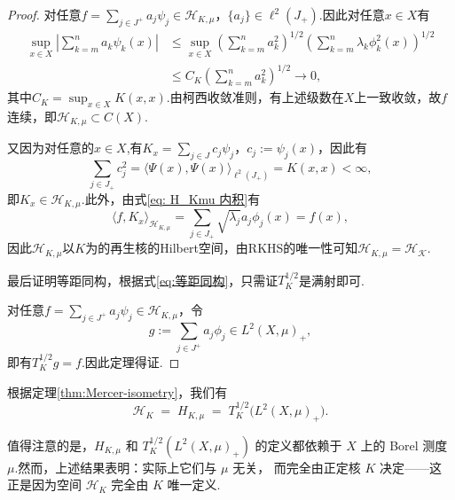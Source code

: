 \documentclass[../master.tex]{subfiles}
\begin{document}
\begin{proof}
    对任意$f = \sum_{j\in J^+}a_j\psi_j\in \mathcal{H}_{K,\mu}$，$\{a_j\}\in \ell^2(J_+)$.因此对任意$x\in X$有
    \begin{align*}
        \sup_{x\in X} \left|\sum_{k=m}^n a_k\psi_k(x)\right|&\leq \sup_{x\in X}\left(\sum_{k=m}^na_k^2\right)^{1/2}\left(\sum_{k=m}^n\lambda_k\phi^2_k(x)\right)^{1/2}\\
        &\leq C_K\left(\sum_{k=m}^na_k^2\right)^{1/2}\to 0,
    \end{align*}
其中$C_K = \sup_{x\in X}K(x,x)$.由柯西收敛准则，有上述级数在$X$上一致收敛，故$f$连续，即$\mathcal{H}_{K,\mu}\subset C(X).$

又因为对任意的$x\in X$,有$K_x = \sum_{j\in J}c_j\psi_j$，$c_j:=\psi_j(x)$，因此有
\begin{equation*}
    \sum_{j\in J_+}c_j^2 = \langle\Psi(x),\Psi(x)\rangle_{\ell^2(J_+)} = K(x,x)<\infty,
\end{equation*}
即$K_x\in \mathcal{H}_{K,\mu}.$此外，由式\eqref{eq: H_Kmu 内积}有
\begin{equation*}
    \langle f,K_x\rangle_{\mathcal{H}_{K,\mu}}=\sum_{j\in J_+}\sqrt{\lambda_j}a_j\phi_j(x) = f(x),
\end{equation*}
因此$\mathcal{H}_{K,\mu}$以$K$为的再生核的Hilbert空间，由RKHS的唯一性可知$\mathcal{H}_{K,\mu}=\mathcal{H_K}.$

最后证明等距同构，根据式\eqref{eq:等距同构}，只需证$T_K^{1/2}$是满射即可.

对任意$f = \sum_{j\in J^+}a_j\psi_j\in \mathcal{H}_{K,\mu}$，令$$g:=\sum_{j\in J^+}a_j\phi_j\in L^2(X,\mu)_+,$$即有$T_K^{1/2}g = f$.因此定理得证.
\end{proof}
根据定理\ref{thm:Mercer-isometry}，我们有
\[
\mathcal{H}_K \;=\; H_{K,\mu} \;=\; T_K^{1/2}\big(L^{2}(X,\mu)_{+}\big).
\]

值得注意的是，$H_{K,\mu}$ 和 $T_K^{1/2}\!\left(L^{2}(X,\mu)_{+}\right)$ 的定义都依赖于
$X$ 上的 Borel 测度 $\mu$.然而，上述结果表明：实际上它们与 $\mu$ 无关，
而完全由正定核 $K$ 决定——这正是因为空间 $\mathcal{H}_K$ 完全由 $K$ 唯一定义.
\end{document}
